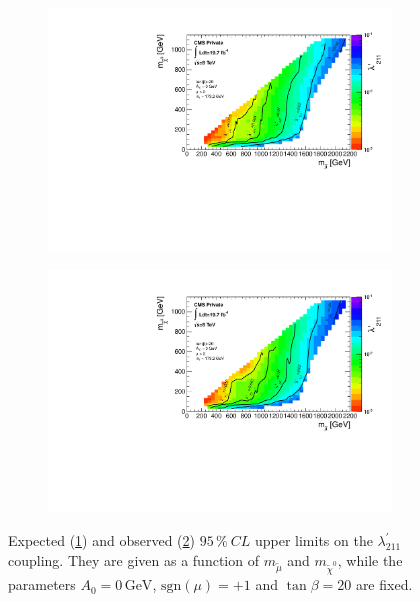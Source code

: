 \begin{figure}[!htbp]
  \centering
  \begin{subfigure}[b]{0.90\textwidth}
    \centering
    \includegraphics[width=\textwidth]{plots/plot_smuon_neutralino_mass_expectedLimitsCombine.pdf}
    \caption{\label{fig:m-smu-nt0-exp}}
  \end{subfigure}
  \begin{subfigure}[b]{0.90\textwidth}
    \centering
    \includegraphics[width=\textwidth]{plots/plot_smuon_neutralino_mass_LimitsCombine.pdf}
    \caption{\label{fig:m-smu-nt0-obs}}
  \end{subfigure}
  \caption{Expected (\ref{fig:m-smu-nt0-exp}) and observed (\ref{fig:m-smu-nt0-obs}) $95\,\%\: CL$ upper limits on the $\lambda^{\prime}_{211}$ coupling. They are given as a function of $m_{\tilde{\mu}}$ and $m_{\tilde{\chi}^0}$, while the parameters $A_0 = 0\,\text{GeV}$, $\text{sgn}(\mu) = +1$ and $\tan{\beta} = 20$ are fixed.}
  \label{fig:smu-nt0-limits}
\end{figure}


